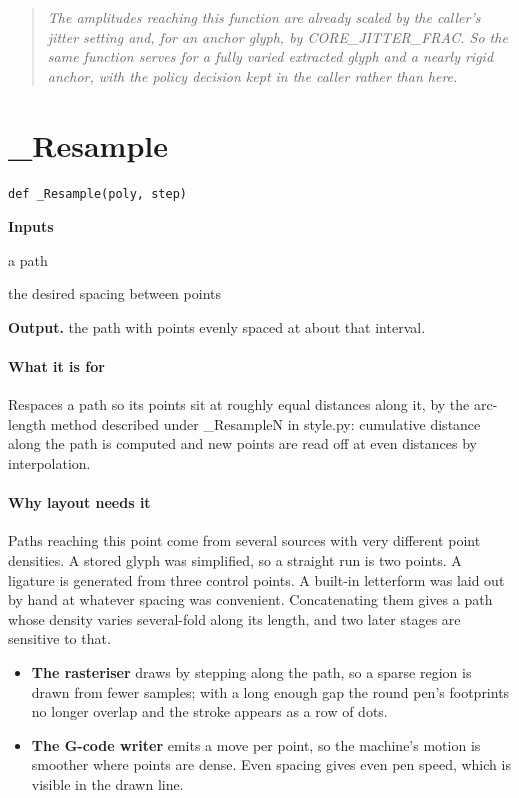 \begin{quote}\small\itshape The amplitudes reaching this function are already scaled by the caller's jitter setting and, for an anchor glyph, by CORE\_JITTER\_FRAC. So the same function serves for a fully varied extracted glyph and a nearly rigid anchor, with the policy decision kept in the caller rather than here.\end{quote}

\section{\_Resample}
\begin{lstlisting}[style=sig]
def _Resample(poly, step)
\end{lstlisting}

\noindent\textbf{Inputs}
\begin{description}[leftmargin=2.2em,style=nextline,font=\normalfont\ttfamily]\setlength\itemsep{1pt}
  \item[{poly}] \normalfont a path
  \item[{step}] \normalfont the desired spacing between points
\end{description}

\noindent\textbf{Output.} the path with points evenly spaced at about that interval.


\paragraph{What it is for}
Respaces a path so its points sit at roughly equal distances along it, by the arc-length method described under \_ResampleN in style.py: cumulative distance along the path is computed and new points are read off at even distances by interpolation.


\paragraph{Why layout needs it}
Paths reaching this point come from several sources with very different point densities. A stored glyph was simplified, so a straight run is two points. A ligature is generated from three control points. A built-in letterform was laid out by hand at whatever spacing was convenient. Concatenating them gives a path whose density varies several-fold along its length, and two later stages are sensitive to that.


\begin{itemize}\setlength\itemsep{0pt}
  \item \textbf{The rasteriser} draws by stepping along the path, so a sparse region is drawn from fewer samples; with a long enough gap the round pen's footprints no longer overlap and the stroke appears as a row of dots.
  \item \textbf{The G-code writer} emits a move per point, so the machine's motion is smoother where points are dense. Even spacing gives even pen speed, which is visible in the drawn line.
\end{itemize}

